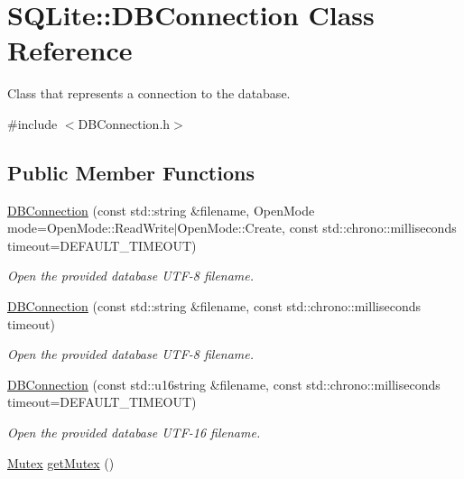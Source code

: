 \hypertarget{a00002}{\section{S\-Q\-Lite\-:\-:D\-B\-Connection Class Reference}
\label{a00002}
}


Class that represents a connection to the database.  




{\ttfamily \#include $<$D\-B\-Connection.\-h$>$}

\subsection*{Public Member Functions}
\begin{DoxyCompactItemize}
\item 
\hyperlink{a00002_acc17774b1187ee5b9706398d5ed7786b}{D\-B\-Connection} (const std\-::string \&filename, Open\-Mode mode=Open\-Mode\-::\-Read\-Write$\vert$Open\-Mode\-::\-Create, const std\-::chrono\-::milliseconds timeout=D\-E\-F\-A\-U\-L\-T\-\_\-\-T\-I\-M\-E\-O\-U\-T)
\begin{DoxyCompactList}\small\item\em Open the provided database U\-T\-F-\/8 filename. \end{DoxyCompactList}\item 
\hyperlink{a00002_a62ddef495423a8da480a811c7f8bda1f}{D\-B\-Connection} (const std\-::string \&filename, const std\-::chrono\-::milliseconds timeout)
\begin{DoxyCompactList}\small\item\em Open the provided database U\-T\-F-\/8 filename. \end{DoxyCompactList}\item 
\hyperlink{a00002_a801e3c745e0236c2b55b91c47cc73da8}{D\-B\-Connection} (const std\-::u16string \&filename, const std\-::chrono\-::milliseconds timeout=D\-E\-F\-A\-U\-L\-T\-\_\-\-T\-I\-M\-E\-O\-U\-T)
\begin{DoxyCompactList}\small\item\em Open the provided database U\-T\-F-\/16 filename. \end{DoxyCompactList}\item 
\hypertarget{a00002_afd4961c42310aebf750d28d3487a9425}{\hyperlink{a00005}{Mutex} \hyperlink{a00002_afd4961c42310aebf750d28d3487a9425}{get\-Mutex} ()}\label{a00002_afd4961c42310aebf750d28d3487a9425}


\end{DoxyCompactItemize}
